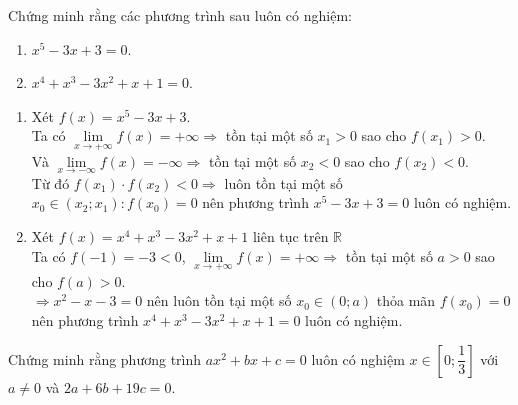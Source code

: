 \begin{vd}%
	Chứng minh rằng các phương trình sau luôn có nghiệm:
	\begin{enumerate}
		\item $x^5-3 x+3=0$.
		\item $x^4+x^3-3 x^2+x+1=0$.
	\end{enumerate}
	\loigiai
	{\begin{enumerate}
			\item Xét $f(x)=x^5-3 x+3$.\\
			Ta có
			$\lim\limits_{x \rightarrow+\infty} f(x)=+\infty \Rightarrow$ tồn tại một số $x_1>0$ sao cho $f\left(x_1\right)>0$.\\
			Và $\lim\limits_{x \rightarrow-\infty} f(x)=-\infty \Rightarrow$ tồn tại một số $x_2<0$ sao cho $f\left(x_2\right)<0$.\\
			Từ đó $f\left(x_1\right) \cdot f\left(x_2\right)<0 \Rightarrow$ luôn tồn tại một số $x_0 \in\left(x_2 ; x_1\right): f\left(x_0\right)=0$ nên phương trình $x^5-3 x+3=0$ luôn có nghiệm.
			\item Xét $f(x)=x^4+x^3-3 x^2+x+1$ liên tục trên $\mathbb{R}$\\
			Ta có $f(-1)=-3<0$,
			$\lim\limits_{x \rightarrow+\infty} f(x)=+\infty \Rightarrow$ tồn tại một số $a>0$ sao cho $f(a)>0$.\\
			$\Rightarrow x^2-x-3=0$ nên luôn tồn tại một số $x_0 \in(0 ; a)$ thỏa mãn $f\left(x_0\right)=0$ nên phương trình $x^4+x^3-3 x^2+x+1=0$ luôn có nghiệm.	
		\end{enumerate}
	}
\end{vd}

\begin{vd}%
	Chứng minh rằng phương trình $a x^2+b x+c=0$ luôn có nghiệm $x \in\left[0 ; \dfrac{1}{3}\right]$ với $a \neq 0$ và $2 a+6 b+19 c=0$.
\end{vd}

